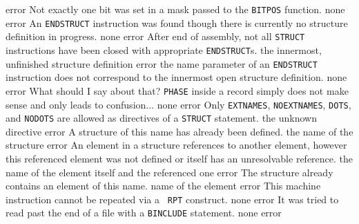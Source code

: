 \documentclass[12pt,twoside]{report}
\newcommand{\tty}[1]{{\tt #1}}
\begin{document}
\begin{description}
               {error}
               {Not exactly one bit was set in a mask passed to the
                \tty{BITPOS} function.}
               {none}
               {error}
               {An \tty{ENDSTRUCT} instruction was found though there is
                currently no structure definition in progress.}
               {none}
               {error}
               {After end of assembly, not all \tty{STRUCT} instructions
                have been closed with appropriate \tty{ENDSTRUCT}s.}
               {the innermost, unfinished structure definition}
               {error}
               {the name parameter of an \tty{ENDSTRUCT} instruction does
                not correspond to the innermost open structure
                definition.}
               {none}
               {error}
               {What should I say about that?  \tty{PHASE} inside a record
                simply does not make sense and only leads to
                confusion...}
               {none}
\errentry{1554}{invalid \tty{STRUCT} directive}
               {error}
               {Only \tty{EXTNAMES}, \tty{NOEXTNAMES}, \tty{DOTS},
                and \tty{NODOTS} are allowed as directives of a
                \tty{STRUCT} statement.}
               {the unknown directive}
               {error}
               {A structure of this name has already been defined.}
               {the name of the structure}
               {error}
               {An element in a structure references to another
                element, however this referenced element was not
                defined or itself has an unresolvable reference.}
               {the name of the element itself and the referenced one}
               {error}
               {The structure already contains an element of this name.}
               {name of the element}
               {error}
               {This machine instruction cannot be repeated via a {\tt
                RPT} construct.}
               {none}
               {error}
               {It was tried to read past the end of a file with a
                \tty{BINCLUDE} statement.}
               {none}
               {error}

\end{description}
\end{document}
